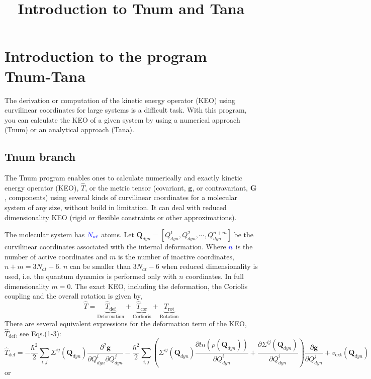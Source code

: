 \documentclass[a4paper,10pt]{article}
\title{Introduction to Tnum and Tana}
\begin{document}
\section{Introduction to the program Tnum-Tana}
The derivation or computation of the kinetic energy operator (KEO) using curvilinear
coordinates for large systems is a difficult task. With this program,
you can calculate the KEO of a given system by using
a numerical approach (Tnum) or an analytical approach (Tana). 
\subsection{Tnum branch}
The Tnum program enables ones to calculate numerically and exactly kinetic
energy operator (KEO), $\hat{T}$, or
the metric tensor (covariant, $\mathbf{g}$, or contravariant, $\mathbf{G}$,
components) using several
kinds of curvilinear coordinates for a molecular system of any size, without
build in limitation.
It can deal with reduced dimensionality KEO (rigid or flexible constraints or
other approximations).

The molecular system has $\textcolor{blue}{N_{at}}$ atoms.
Let $\mathbf{Q}_{dyn} = [Q_{dyn}^1, Q_{dyn}^2, \cdots, Q_{dyn}^{n+m}]$ be the curvilinear coordinates 
associated with the internal deformation.
Where $\textcolor{blue}{n}$ is the number of active coordinates 
and $m$ is the number of inactive coordinates, 
 $n+m = 3N_{at}-6$. 
$n$ can be smaller than $3N_{at}-6$ when
 reduced dimensionality is used, i.e. the quantum dynamics is performed only
 with $n$ coordinates.
 In full dimensionality $m=0$.
The exact KEO, including the deformation, the Coriolis coupling and the overall
rotation is given by,
$$\hat{T} = 
\underbrace{\hat{T}_\mathrm{def}}_\mathrm{Deformation} + 
\underbrace{\hat{T}_\mathrm{cor}}_\mathrm{Corlioris} + 
\underbrace{\hat{T}_\mathrm{rot}}_\mathrm{Rotation} 
$$
 There are several equivalent expressions for the deformation term of the KEO,
 $\hat{T}_\mathrm{def }$, see Eqs.(1-3):
\begin{equation}
  \hat{T}_\mathrm{def}= -\frac{\hbar^2}{2}\sum_{i,j} \Sigma^{ij}(\mathbf{Q}_{dyn})
         \frac{\partial^2 \mathbf{g}}{\partial Q_{dyn}^i \partial Q_{dyn}^j}
         -\frac{\hbar^2}{2}\sum_{i,j} 
         \left(\Sigma^{ij}(\mathbf{Q}_{dyn})
         \frac{\partial ln\left(\rho(\mathbf{Q}_{dyn})\right)}{\partial Q_{dyn}^i}
         +\frac{\partial \Sigma^{ij}(\mathbf{Q}_{dyn})}{\partial Q_{dyn}^i}
         \right) 
         \frac{\partial \mathbf{g}}{\partial Q_{dyn}^j}
         + v_{\mathrm{ext}}(\mathbf{Q}_{dyn})
 \end{equation}
 or
\end{document}
